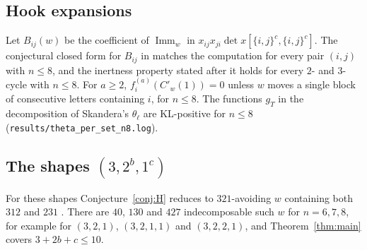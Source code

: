 \documentclass[11pt]{amsart}
\theoremstyle{definition}
\theoremstyle{remark}
\newcommand{\Imm}{\operatorname{Imm}}
\newcommand{\Cp}[1]{C'_{#1}(1)}
\begin{document}
\subsection{Hook expansions}
Let $B_{ij}(w)$ be the coefficient of $\Imm_w$ in $x_{ij}x_{ji}\det x[\{i,j\}^c,\{i,j\}^c]$. The conjectural closed form for $B_{ij}$ in \cite[Conj.~10.1]{McN} matches the computation for every pair $(i,j)$ with $n\le8$, and the inertness property stated after it holds for every $2$- and $3$-cycle with $n\le8$. For $a\ge2$, $f^{(a)}_i(\Cp w)=0$ unless $w$ moves a single block of consecutive letters containing $i$, for $n\le8$. The functions $g_T$ in the decomposition of Skandera's $\theta_\ell$ are KL-positive for $n\le8$ (\nolinkurl{results/theta_per_set_n8.log}).

\subsection{The shapes $(3,2^b,1^c)$}
For these shapes Conjecture~\ref{conj:H} reduces to $321$-avoiding $w$ containing both $312$ and $231$ \cite[Props.~7.2, 8.2]{McN}. There are $40$, $130$ and $427$ indecomposable such $w$ for $n=6,7,8$, for example for $(3,2,1)$, $(3,2,1,1)$ and $(3,2,2,1)$, and Theorem~\ref{thm:main} covers $3+2b+c\le10$.
\end{document}
